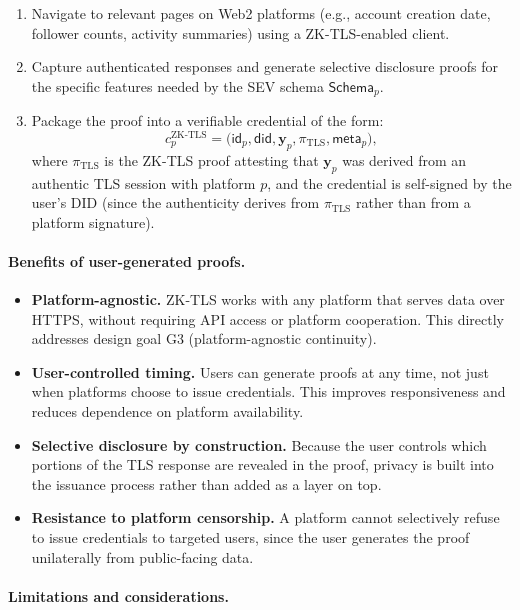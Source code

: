 \documentclass[11pt]{article}
\begin{document}
\begin{enumerate}
  \item Navigate to relevant pages on Web2 platforms (e.g., account creation date, follower counts, activity summaries) using a ZK-TLS-enabled client.
  \item Capture authenticated responses and generate selective disclosure proofs for the specific features needed by the SEV schema $\mathsf{Schema}_p$.
  \item Package the proof into a verifiable credential of the form:
  \[
    c_{p}^{\text{ZK-TLS}} = \big( \mathsf{id}_p, \mathsf{did}, \mathbf{y}_p, \pi_{\text{TLS}}, \textsf{meta}_p \big),
  \]
  where $\pi_{\text{TLS}}$ is the ZK-TLS proof attesting that $\mathbf{y}_p$ was derived from an authentic TLS session with platform $p$, and the credential is self-signed by the user's DID (since the authenticity derives from $\pi_{\text{TLS}}$ rather than from a platform signature).
\end{enumerate}

\paragraph{Benefits of user-generated proofs.}

\begin{itemize}
  \item \textbf{Platform-agnostic.} ZK-TLS works with any platform that serves data over HTTPS, without requiring API access or platform cooperation. This directly addresses design goal G3 (platform-agnostic continuity).
  \item \textbf{User-controlled timing.} Users can generate proofs at any time, not just when platforms choose to issue credentials. This improves responsiveness and reduces dependence on platform availability.
  \item \textbf{Selective disclosure by construction.} Because the user controls which portions of the TLS response are revealed in the proof, privacy is built into the issuance process rather than added as a layer on top.
  \item \textbf{Resistance to platform censorship.} A platform cannot selectively refuse to issue credentials to targeted users, since the user generates the proof unilaterally from public-facing data.
\end{itemize}

\paragraph{Limitations and considerations.}
\end{document}
